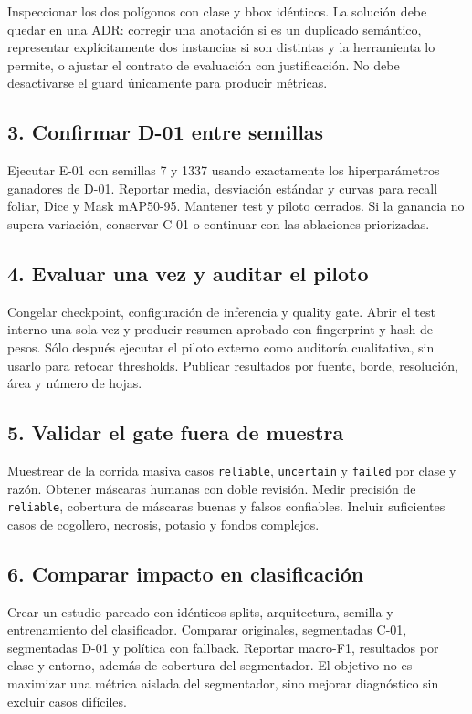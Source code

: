 \documentclass[11pt,a4paper]{article}
\begin{document}
Inspeccionar los dos polígonos con clase y bbox idénticos. La solución debe quedar en una ADR: corregir una anotación si es un duplicado semántico, representar explícitamente dos instancias si son distintas y la herramienta lo permite, o ajustar el contrato de evaluación con justificación. No debe desactivarse el guard únicamente para producir métricas.


\subsection{3. Confirmar D-01 entre semillas}

Ejecutar E-01 con semillas 7 y 1337 usando exactamente los hiperparámetros ganadores de D-01. Reportar media, desviación estándar y curvas para recall foliar, Dice y Mask mAP50-95. Mantener test y piloto cerrados. Si la ganancia no supera variación, conservar C-01 o continuar con las ablaciones priorizadas.


\subsection{4. Evaluar una vez y auditar el piloto}

Congelar checkpoint, configuración de inferencia y quality gate. Abrir el test interno una sola vez y producir resumen aprobado con fingerprint y hash de pesos. Sólo después ejecutar el piloto externo como auditoría cualitativa, sin usarlo para retocar thresholds. Publicar resultados por fuente, borde, resolución, área y número de hojas.


\subsection{5. Validar el gate fuera de muestra}

Muestrear de la corrida masiva casos \texttt{reliable}, \texttt{uncertain} y \texttt{failed} por clase y razón. Obtener máscaras humanas con doble revisión. Medir precisión de \texttt{reliable}, cobertura de máscaras buenas y falsos confiables. Incluir suficientes casos de cogollero, necrosis, potasio y fondos complejos.


\subsection{6. Comparar impacto en clasificación}

Crear un estudio pareado con idénticos splits, arquitectura, semilla y entrenamiento del clasificador. Comparar originales, segmentadas C-01, segmentadas D-01 y política con fallback. Reportar macro-F1, resultados por clase y entorno, además de cobertura del segmentador. El objetivo no es maximizar una métrica aislada del segmentador, sino mejorar diagnóstico sin excluir casos difíciles.
\end{document}

